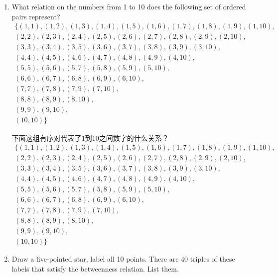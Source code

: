 \begin{enumerate}
    \item What relation on the numbers from 1 to 10 does the following set of ordered pairs
    represent?
    \begin{gather*}
    \{ (1,1), (1,2), (1,3), (1,4), (1,5), (1,6), (1,7), (1,8), (1,9), (1,10), \\
    (2,2), (2,3), (2,4), (2,5), (2,6), (2,7), (2,8), (2,9), (2,10), \\
    (3,3), (3,4), (3,5), (3,6), (3,7), (3,8), (3,9), (3,10), \\
    (4,4), (4,5), (4,6), (4,7), (4,8), (4,9), (4,10), \\
    (5,5), (5,6), (5,7), (5,8), (5,9), (5,10), \\
    (6,6), (6,7), (6,8), (6,9), (6,10), \\
    (7,7), (7,8), (7,9), (7,10), \\
    (8,8), (8,9), (8,10), \\
    (9,9), (9,10), \\
    (10,10) \} 
    \end{gather*}
    
    下面这组有序对代表了1到10之间数字的什么关系？
    \begin{gather*}
    \{ (1,1), (1,2), (1,3), (1,4), (1,5), (1,6), (1,7), (1,8), (1,9), (1,10), \\
    (2,2), (2,3), (2,4), (2,5), (2,6), (2,7), (2,8), (2,9), (2,10), \\
    (3,3), (3,4), (3,5), (3,6), (3,7), (3,8), (3,9), (3,10), \\
    (4,4), (4,5), (4,6), (4,7), (4,8), (4,9), (4,10), \\
    (5,5), (5,6), (5,7), (5,8), (5,9), (5,10), \\
    (6,6), (6,7), (6,8), (6,9), (6,10), \\
    (7,7), (7,8), (7,9), (7,10), \\
    (8,8), (8,9), (8,10), \\
    (9,9), (9,10), \\
    (10,10) \} 
    \end{gather*}
    
    \vfill
    
    
    \vfill
    
    \hintspagebreak
    \workbookpagebreak
    
    \item Draw a five-pointed star, label all 10 points. There are 40 triples of these 
    labels that satisfy the betweenness relation.  List them.
    

\end{enumerate}

